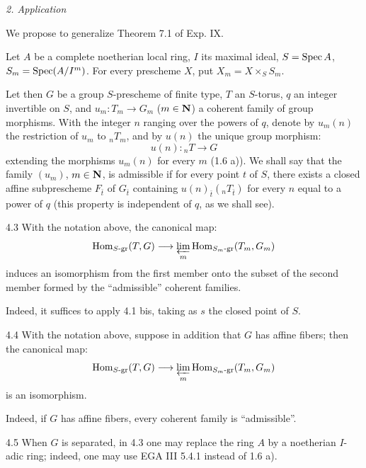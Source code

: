 \par\medskip\noindent\textit{2. Application}\par
We propose to generalize Theorem 7.1 of Exp. IX.

Let $A$ be a complete noetherian local ring, $I$ its maximal ideal, $S=\operatorname{Spec} A$, $S_m=\operatorname{Spec}(A/I^m)$. For every prescheme $X$, put $X_m=X\times_S S_m$.

Let then $G$ be a group $S$-prescheme of finite type, $T$ an $S$-torus, $q$ an integer invertible on $S$, and $u_m:T_m\to G_m$ ($m\in\mathbf{N}$) a coherent family of group morphisms. With the integer $n$ ranging over the powers of $q$, denote by $u_m(n)$ the restriction of $u_m$ to ${}_nT_m$, and by $u(n)$ the unique group morphism:
\[
u(n):{}_nT\to G
\]
extending the morphisms $u_m(n)$ for every $m$ (1.6 a)). We shall say that the family $(u_m)$, $m\in\mathbf{N}$, is admissible if for every point $t$ of $S$, there exists a closed affine subprescheme $F_{\bar t}$ of $G_{\bar t}$ containing $u(n)_{\bar t}({}_nT_{\bar t})$ for every $n$ equal to a power of $q$ (this property is independent of $q$, as we shall see).
\begin{proposition}{4.3}\label{XV.4.3}
With the notation above, the canonical map:
\[
\operatorname{Hom}_{S\text{-gr}}(T,G)\longrightarrow\varprojlim_m\operatorname{Hom}_{S_m\text{-gr}}(T_m,G_m)
\]
induces an isomorphism from the first member onto the subset of the second member formed by the ``admissible'' coherent families.
\end{proposition}
Indeed, it suffices to apply 4.1 bis, taking as $s$ the closed point of $S$.
\begin{corollary}{4.4}\label{XV.4.4}
With the notation above, suppose in addition that $G$ has affine fibers; then the canonical map:
\[
\operatorname{Hom}_{S\text{-gr}}(T,G)\longrightarrow\varprojlim_m\operatorname{Hom}_{S_m\text{-gr}}(T_m,G_m)
\]
is an isomorphism.
\end{corollary}
Indeed, if $G$ has affine fibers, every coherent family is ``admissible''.
\begin{remark}{4.5}\label{XV.4.5}
When $G$ is separated, in 4.3 one may replace the ring $A$ by a noetherian $I$-adic ring; indeed, one may use EGA III 5.4.1 instead of 1.6 a).
\end{remark}

